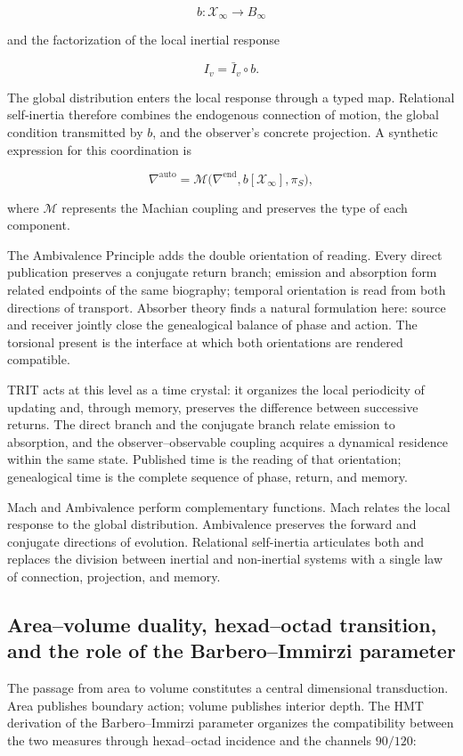 \[
b:\mathcal X_\infty\longrightarrow B_\infty
\]

and the factorization of the local inertial response

\[
I_v=\bar I_v\circ b.
\]

The global distribution enters the local response through a typed map.
Relational self-inertia therefore combines the endogenous connection of
motion, the global condition transmitted by \(b\), and the
observer's concrete projection. A synthetic expression for this
coordination is

\[
\nabla^{\mathrm{auto}}
=
\mathcal M\bigl(
\nabla^{\mathrm{end}},
b[\mathcal X_\infty],
\pi_S
\bigr),
\]

where \(\mathcal M\) represents the Machian coupling and preserves the type of each component.

The Ambivalence Principle adds the double orientation of reading. Every direct publication preserves a conjugate return branch; emission and absorption form related endpoints of the same biography; temporal orientation is read from both directions of transport. Absorber theory finds a natural formulation here: source and receiver jointly close the genealogical balance of phase and action. The torsional present is the interface at which both orientations are rendered compatible.

TRIT acts at this level as a time crystal: it organizes the local periodicity of updating and, through memory, preserves the difference between successive returns. The direct branch and the conjugate branch relate emission to absorption, and the observer--observable coupling acquires a dynamical residence within the same state. Published time is the reading of that orientation; genealogical time is the complete sequence of phase, return, and memory.

Mach and Ambivalence perform complementary functions. Mach relates the local response to the global distribution. Ambivalence preserves the forward and conjugate directions of evolution. Relational self-inertia articulates both and replaces the division between inertial and non-inertial systems with a single law of connection, projection, and memory.

\subsection{Area--volume duality, hexad--octad transition, and the role of the Barbero--Immirzi parameter}

The passage from area to volume constitutes a central dimensional
transduction. Area publishes boundary action; volume publishes interior
depth. The HMT derivation of the Barbero–Immirzi parameter organizes the
compatibility between the two measures through hexad–octad incidence and
the channels \(90/120\):

